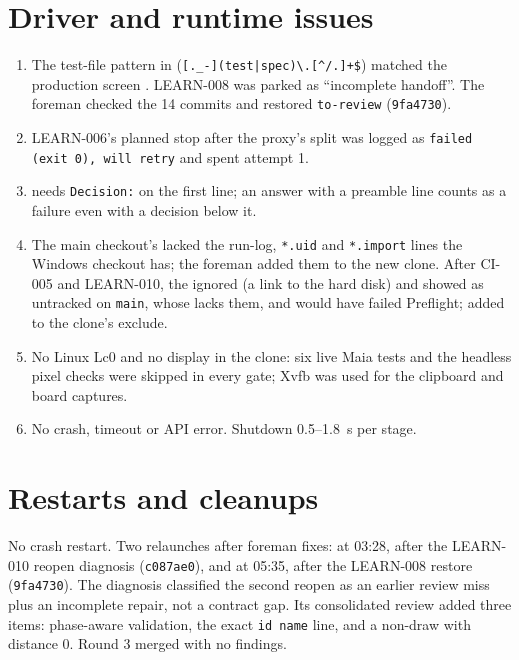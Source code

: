 \documentclass[11pt,a4paper]{article}
\begin{document}
\section*{Driver and runtime issues}

\begin{enumerate}
  \item The test-file pattern in  (\verb![._-](test|spec)\.[^/.]+$!) matched the
        production screen . LEARN-008 was parked as ``incomplete handoff''. The
        foreman checked the 14 commits and restored \texttt{to-review} (\texttt{9fa4730}).
  \item LEARN-006's planned stop after the proxy's split was logged as \texttt{failed (exit 0), will
        retry} and spent attempt 1.
  \item {} needs \texttt{Decision:} on the first line; an answer with a preamble
        line counts as a failure even with a decision below it.
  \item The main checkout's  lacked the run-log, \texttt{*.uid} and
        \texttt{*.import} lines the Windows checkout has; the foreman added them to the new clone.
        After CI-005 and LEARN-010, the ignored  (a link to the hard disk) and
         showed as untracked on \texttt{main}, whose  lacks them, and
        would have failed Preflight; added to the clone's exclude.
  \item No Linux Lc0 and no display in the clone: six live Maia tests and the headless pixel checks were
        skipped in every gate; Xvfb was used for the clipboard and board captures.
  \item No crash, timeout or API error. Shutdown 0.5--1.8~s per stage.
\end{enumerate}

\section*{Restarts and cleanups}

No crash restart. Two relaunches after foreman fixes: at 03:28, after the LEARN-010 reopen
diagnosis (\texttt{c087ae0}), and at 05:35, after the LEARN-008 restore (\texttt{9fa4730}).
The diagnosis classified the second reopen as an earlier review miss plus an incomplete repair, not
a contract gap. Its consolidated review added three items: phase-aware validation, the exact
\texttt{id name} line, and a non-draw with distance 0. Round 3 merged with no findings.
\end{document}

